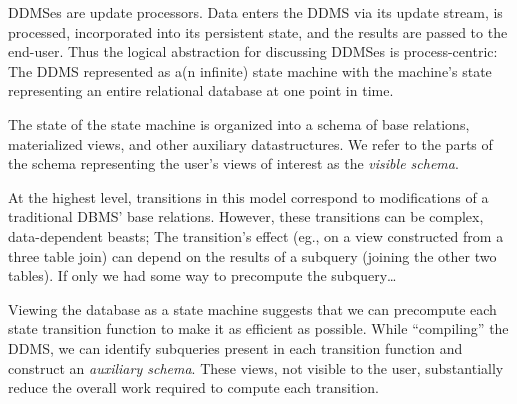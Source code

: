 

DDMSes are update processors.  Data enters the DDMS via its update stream, is
processed, incorporated into its persistent state, and the results are passed to
the end-user.  Thus the logical abstraction for discussing DDMSes is
process-centric: The DDMS represented as a(n infinite) state machine with the
machine's state representing an entire relational database at one point in time.

The state of the state machine is organized into a schema of
base relations, materialized views, and other auxiliary datastructures.  We
refer to the parts of the schema representing the user's views of interest as the \textit{visible schema}.

At the highest level, transitions in this model correspond to modifications of a traditional DBMS' base relations.  However, these transitions can be complex, data-dependent beasts; The transition's effect (eg., on a view constructed from a three table join) can depend on the results of a subquery (joining the other two tables).  If only we had some way to precompute the subquery\ldots

Viewing the database as a state machine suggests that we can precompute each state transition function to make it as efficient as possible.  While ``compiling'' the DDMS, we can identify subqueries present in each transition function and construct an \textit{auxiliary schema}.  These views, not visible to the user, substantially reduce the overall work required to compute each transition.

